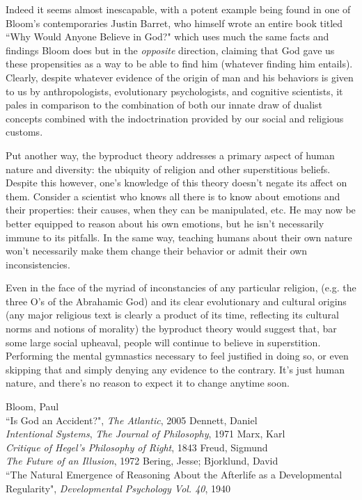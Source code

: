 \documentclass{article}
\begin{document}
Indeed it seems almost inescapable, with a potent example being found in one of Bloom's contemporaries Justin Barret, who himself wrote an entire book titled ``Why Would Anyone Believe in God?" which uses much the same facts and findings Bloom does but in the \emph{opposite} direction, claiming that God gave us these propensities as a way to be able to find him (whatever finding him entails). Clearly, despite whatever evidence of the origin of man and his behaviors is given to us by anthropologists, evolutionary psychologists, and cognitive scientists, it pales in comparison to the combination of both our innate draw of dualist concepts combined with the indoctrination provided by our social and religious customs.

Put another way, the byproduct theory addresses a primary aspect of human nature and diversity: the ubiquity of religion and other superstitious beliefs. Despite this however, one's knowledge of this theory doesn't negate its affect on them. Consider a scientist who knows all there is to know about emotions and their properties: their causes, when they can be manipulated, etc. He may now be better equipped to reason about his own emotions, but he isn't necessarily immune to its pitfalls. In the same way, teaching humans about their own nature won't necessarily make them change their behavior or admit their own inconsistencies.

Even in the face of the myriad of inconstancies of any particular religion, (e.g. the three O's of the Abrahamic God) and its clear evolutionary and cultural origins (any major religious text is clearly a product of its time, reflecting its cultural norms and notions of morality) the byproduct theory would suggest that, bar some large social upheaval, people will continue to believe in superstition. Performing the mental gymnastics necessary to feel justified in doing so, or even skipping that and simply denying any evidence to the contrary. It's just human nature, and there's no reason to expect it to change anytime soon.

\begin{thebibliography}{999}
  Bloom, Paul\\
  ``Is God an Accident?", \emph{The Atlantic}, 2005
  Dennett, Daniel\\
  \emph{Intentional Systems}, \emph{The Journal of Philosophy}, 1971
  Marx, Karl\\
  \emph{Critique of Hegel's Philosophy of Right}, 1843
  Freud, Sigmund\\
  \emph{The Future of an Illusion}, 1972
  Bering, Jesse; Bjorklund, David\\
  ``The Natural Emergence of Reasoning About the Afterlife as a
  Developmental Regularity", \emph{Developmental Psychology Vol. 40}, 1940
\end{thebibliography}
\end{document}
